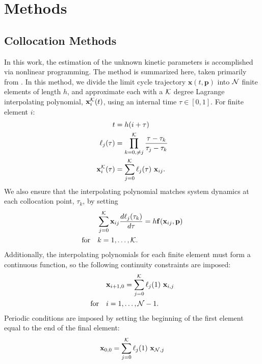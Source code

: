 \section{Methods}
\subsection{Collocation Methods} \label{sec:coll}

In this work, the estimation of the unknown kinetic parameters is accomplished
via nonlinear programming.  The method is summarized here, taken primarily from
\cite{Biegler2010}. In this method, we divide the limit cycle
trajectory ${\bm x}(t, {\bm p})$ into $\cal N$ finite elements of length $h$, and approximate each with a
$\cal K$ degree Lagrange interpolating polynomial, ${\mathbf{x}}_i^{\cal K}(t)$, using an internal time
$\tau \in [0,1]$. For finite element $i$:
\begin{equation}
  \begin{aligned} t &= h (i + \tau) \\ \ell_j(\tau) &= \prod^{\cal K}_{k=0,\ne j}
    \frac{\tau - \tau_k}{\tau_j - \tau_k}\\ {\mathbf{x}}_i^{\cal K}(\tau) &= \sum^{\cal K}_{j=0}
    \ell_j(\tau) \ {\mathbf{x}}_{ij}.
\end{aligned}
\end{equation}
We also ensure that the interpolating polynomial matches system
dynamics at each collocation point, $\tau_k$, by setting
\begin{equation} \label{eq:collocation}
  \begin{aligned} &\sum^{\cal K}_{j=0} {\mathbf{x}}_{ij}\frac{d\ell_j(\tau_k)}{d\tau} = h
    {\mathbf{f}}({\mathbf{x}}_{ij},{\mathbf{p}}) \\ \textrm{for}\quad &k = 1, \ldots, {\cal K}.
  \end{aligned}
\end{equation}
Additionally, the interpolating polynomials for each finite
element must form a continuous function, so the following continuity
constraints are imposed:
\begin{equation} \label{eq:cont}
  \begin{aligned} &{\mathbf{x}}_{i+1,0} = \sum_{j = 0}^{\cal K} \ell_j(1) \ {\mathbf{x}}_{i,j} \\
    \textrm{for}\quad &i = 1,\ldots,{\cal N}-1.
  \end{aligned}
\end{equation} Periodic conditions are imposed by setting the
beginning of the first element equal to the end of the final element:
\begin{equation} \label{eq:periodic}
  {\mathbf{x}}_{0,0} = \sum_{j = 0}^{{\cal K}} \ell_j(1) \ {\mathbf{x}}_{{\cal N},j}
\end{equation}

